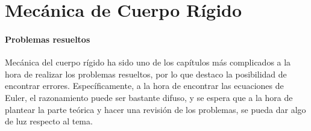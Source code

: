 \documentclass[/home/hernan-barquero/Documents/Apuntes_mecanica_teorica/main.tex]{subfiles}
\begin{document}
    \part{Mecánica de Cuerpo Rígido}


    \subsection{Problemas resueltos}

    Mecánica del cuerpo rígido ha sido uno de los capítulos más complicados a la hora de realizar los problemas resueltos, por lo que destaco la posibilidad de encontrar errores. Específicamente, a la hora de encontrar las ecuaciones de Euler, el razonamiento puede ser bastante difuso, y se espera que a la hora de plantear la parte teórica y hacer una revisión de los problemas, se pueda dar algo de luz respecto al tema.

    
\end{document}
